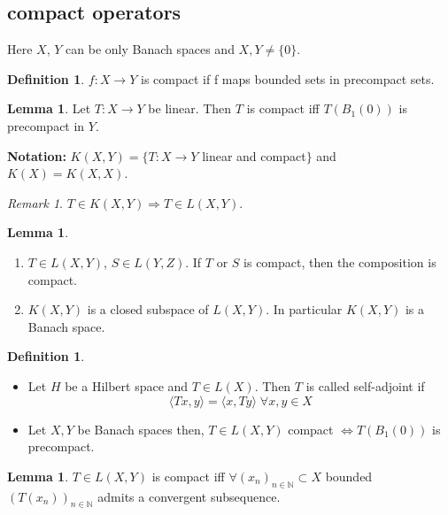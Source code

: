 \documentclass[a4paper, 12pt]{article}
\theoremstyle{plain}
\theoremstyle{definition}
\newtheorem{definition}[theorem]{Definition} %
\theoremstyle{lemma}
\newtheorem{lemma}[theorem]{Lemma}
\theoremstyle{remark}
\newtheorem{remark}[theorem]{Remark}
\theoremstyle{corollary}
\theoremstyle{example}
\begin{document}
	\subsection{compact operators}
	Here $X$, $Y$ can be only Banach spaces and $X,Y \neq \{0\}$.
	\begin{definition}
		$f: X \to Y$ is compact if f maps bounded sets in precompact sets.
	\end{definition}
	\begin{lemma}
		Let $T: X \to Y$ be linear. Then $T$ is compact iff $T(B_1(0))$ is precompact in $Y$.
	\end{lemma}
	\noindent\textbf{Notation:} $K(X,Y) = \{T: X \to Y $ linear and compact$\}$ and $K(X) = K(X,X)$.
	\begin{remark}
		$T \in K(X,Y) \Rightarrow T \in L(X,Y)$.
	\end{remark}
	\begin{lemma}
		\begin{enumerate}
			\item $T \in L(X,Y)$, $S\in L(Y,Z)$. If $T$ or $S$ is compact, then the composition is compact.
			\item $K(X,Y)$ is a closed subspace of $L(X,Y)$. In particular $K(X,Y)$ is a Banach space.
		\end{enumerate}
	\end{lemma}
	\begin{definition}
		\begin{itemize}
			\item Let $H$ be a Hilbert space and $T\in L(X)$. Then $T$ is called self-adjoint if \[\langle Tx,y\rangle = \langle x,Ty\rangle \; \forall x,y \in X\]
			\item Let $X,Y$ be Banach spaces then, $T\in L(X,Y)$ compact $\Leftrightarrow T(B_1(0))$ is precompact.
		\end{itemize}
	\end{definition}
	\begin{lemma}
		$T\in L(X,Y)$ is compact iff $\forall (x_n)_{n\in \mathbb{N}} \subset X$ bounded $(T(x_n))_{n\in \mathbb{N}}$ admits a convergent subsequence.
	\end{lemma}
\end{document}
